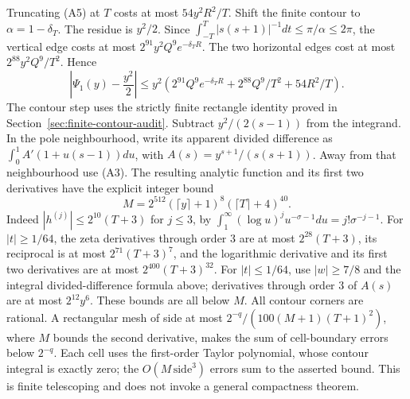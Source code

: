 Truncating (A5) at $T$ costs at most $54y^2R^2/T$.
Shift the finite contour to $\alpha=1-\delta_T$. The residue is $y^2/2$.
Since $\int_{-T}^T|s(s+1)|^{-1}dt\le\pi/\alpha\le2\pi$,
the vertical edge costs at most $2^{91}y^2Q^9e^{-\delta_TR}$.
The two horizontal edges cost at most $2^{88}y^2Q^9/T^2$.
Hence
\[
 \left|\Psi_1(y)-\frac{y^2}2\right|
 \le y^2\left(2^{91}Q^9e^{-\delta_TR}
      +2^{88}Q^9/T^2+54R^2/T\right).                       \tag{A6}
\]
The contour step uses the strictly finite rectangle identity proved in Section~\ref{sec:finite-contour-audit}.
Subtract $y^2/(2(s-1))$ from the integrand. In the pole neighbourhood,
write its apparent divided difference as
$\int_0^1 A'(1+u(s-1))du$, with $A(s)=y^{s+1}/(s(s+1))$.
Away from that neighbourhood use (A3). The resulting analytic function
and its first two derivatives have the explicit integer bound
\[
 M=2^{512}(\lceil y\rceil+1)^8(\lceil T\rceil+4)^{40}.
\]
Indeed $|h^{(j)}|\le2^{10}(T+3)$ for $j\le3$, by
$\int_1^\infty(\log u)^ju^{-\sigma-1}du=j!\sigma^{-j-1}$.
For $|t|\ge1/64$, the zeta derivatives through order $3$ are at most
$2^{28}(T+3)$, its reciprocal is at most $2^{71}(T+3)^7$, and the
logarithmic derivative and its first two derivatives are at most
$2^{400}(T+3)^{32}$. For $|t|\le1/64$, use $|w|\ge7/8$ and the
integral divided-difference formula above; derivatives through order $3$
of $A(s)$ are at most $2^{12}y^6$. These bounds are all below $M$.
All contour corners are rational. A rectangular
mesh of side at most $2^{-q}/(100(M+1)(T+1)^2)$, where $M$ bounds the
second derivative, makes the sum of cell-boundary errors below $2^{-q}$.
Each cell uses the first-order Taylor polynomial, whose contour integral
is exactly zero; the $O(M\,\text{side}^3)$ errors sum to the asserted bound.
This is finite telescoping and does not invoke a general compactness theorem.

